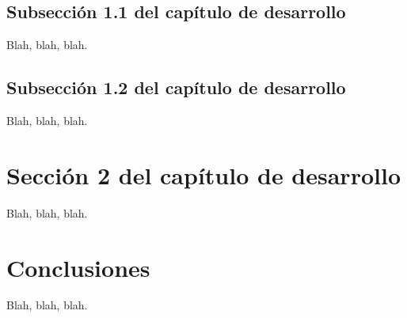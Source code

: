 \subsection{Subsección 1.1 del capítulo de desarrollo}
\label{sec:development-11}

Blah, blah, blah.


\subsection{Subsección 1.2 del capítulo de desarrollo}
\label{sec:development-12}

Blah, blah, blah.



\section{Sección 2 del capítulo de desarrollo}
\label{sec:development-2}

Blah, blah, blah.




\section{Conclusiones}
\label{sec:development-conclusions}

Blah, blah, blah.



